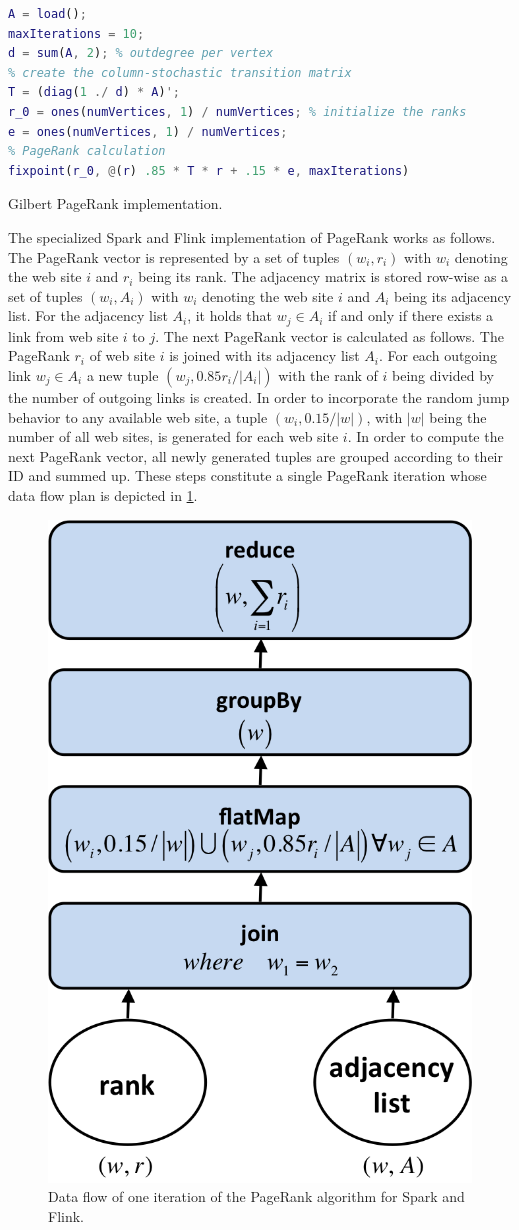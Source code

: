 \begin{listing}[!h]
	\begin{CenteredBox}
		\begin{lstlisting}[language=Matlab,
		commentstyle=\color{black},
		  stringstyle=\color{black},
		  keywordstyle=\color{black}\bfseries,
		  morekeywords={ones, fixpoint},]
% load adjacency matrix
A = load();
maxIterations = 10;
d = sum(A, 2); % outdegree per vertex
% create the column-stochastic transition matrix
T = (diag(1 ./ d) * A)'; 
r_0 = ones(numVertices, 1) / numVertices; % initialize the ranks
e = ones(numVertices, 1) / numVertices;
% PageRank calculation
fixpoint(r_0, @(r) .85 * T * r + .15 * e, maxIterations)
		\end{lstlisting}
	\end{CenteredBox}
	\caption{Gilbert PageRank implementation.}
	\label{lst:gilbertPageRank}
\end{listing}

The specialized Spark and Flink implementation of PageRank works as follows.
The PageRank vector is represented by a set of tuples $(w_i, r_i)$ with $w_i$ denoting the web site $i$ and $r_i$ being its rank.
The adjacency matrix is stored row-wise as a set of tuples $(w_i, A_i)$ with $w_i$ denoting the web site $i$ and $A_i$ being its adjacency list.
For the adjacency list $A_i$, it holds that $w_j \in A_i$ if and only if there exists a link from web site $i$ to $j$.
The next PageRank vector is calculated as follows.
The PageRank $r_i$ of web site $i$ is joined with its adjacency list $A_i$.
For each outgoing link $w_j \in A_i$ a new tuple $(w_j, 0.85r_i/\left|A_i\right|)$ with the rank of $i$ being divided by the number of outgoing links is created.
In order to incorporate the random jump behavior to any available web site, a tuple $(w_i, 0.15/|w|)$, with $|w|$ being the number of all web sites, is generated for each web site $i$.
In order to compute the next PageRank vector, all newly generated tuples are grouped according to their ID and summed up.
These steps constitute a single PageRank iteration whose data flow plan is depicted in \cref{fig:pageRankDataFlow}.

\begin{figure}[!h]
	\centering
	\includegraphics[width=.3\linewidth]{images/pageRankStep.png}
	\caption{Data flow of one iteration of the PageRank algorithm for Spark and Flink.}
	\label{fig:pageRankDataFlow}
\end{figure}

